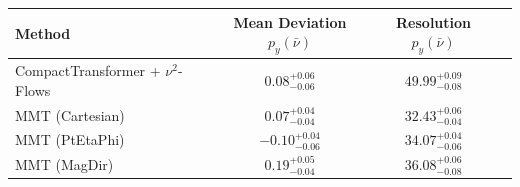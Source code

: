     \begin{tabular}{lccc}
        \toprule
        Method & Mean Deviation $p_{y}(\bar{\nu})$ & Resolution $p_{y}(\bar{\nu})$ \\
        \midrule
        CompactTransformer + $\nu^2$-Flows & $0.08^{+0.06}_{-0.06}$ & $49.99^{+0.09}_{-0.08}$ \\
        MMT (Cartesian) & $0.07^{+0.04}_{-0.04}$ & $32.43^{+0.06}_{-0.04}$ \\
        MMT (PtEtaPhi) & $-0.10^{+0.04}_{-0.06}$ & $34.07^{+0.04}_{-0.06}$ \\
        MMT (MagDir) & $0.19^{+0.05}_{-0.04}$ & $36.08^{+0.06}_{-0.08}$ \\
        \bottomrule
    \end{tabular}